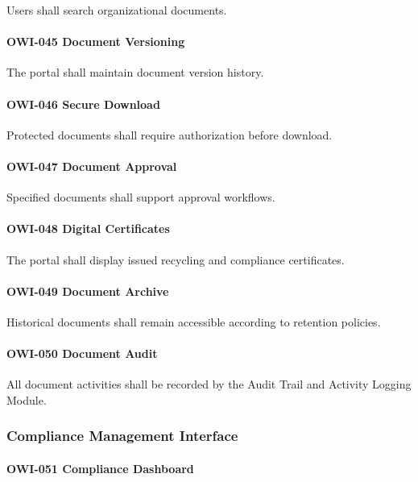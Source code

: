 Users shall search organizational documents.

\paragraph{OWI-045 Document Versioning}

The portal shall maintain document version history.

\paragraph{OWI-046 Secure Download}

Protected documents shall require authorization before download.

\paragraph{OWI-047 Document Approval}

Specified documents shall support approval workflows.

\paragraph{OWI-048 Digital Certificates}

The portal shall display issued recycling and compliance certificates.

\paragraph{OWI-049 Document Archive}

Historical documents shall remain accessible according to retention
policies.

\paragraph{OWI-050 Document Audit}

All document activities shall be recorded by the Audit Trail and
Activity Logging Module.


\subsubsection*{Compliance Management Interface}

\paragraph{OWI-051 Compliance Dashboard}

